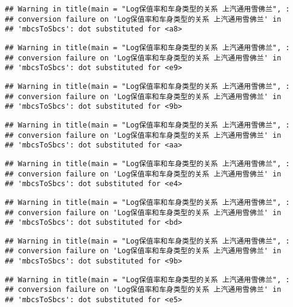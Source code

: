 \documentclass[]{article}
\begin{document}
\begin{verbatim}
## Warning in title(main = "Log保值率和车身类型的关系 上汽通用雪佛兰", :
## conversion failure on 'Log保值率和车身类型的关系 上汽通用雪佛兰' in
## 'mbcsToSbcs': dot substituted for <a8>
\end{verbatim}

\begin{verbatim}
## Warning in title(main = "Log保值率和车身类型的关系 上汽通用雪佛兰", :
## conversion failure on 'Log保值率和车身类型的关系 上汽通用雪佛兰' in
## 'mbcsToSbcs': dot substituted for <e9>
\end{verbatim}

\begin{verbatim}
## Warning in title(main = "Log保值率和车身类型的关系 上汽通用雪佛兰", :
## conversion failure on 'Log保值率和车身类型的关系 上汽通用雪佛兰' in
## 'mbcsToSbcs': dot substituted for <9b>
\end{verbatim}

\begin{verbatim}
## Warning in title(main = "Log保值率和车身类型的关系 上汽通用雪佛兰", :
## conversion failure on 'Log保值率和车身类型的关系 上汽通用雪佛兰' in
## 'mbcsToSbcs': dot substituted for <aa>
\end{verbatim}

\begin{verbatim}
## Warning in title(main = "Log保值率和车身类型的关系 上汽通用雪佛兰", :
## conversion failure on 'Log保值率和车身类型的关系 上汽通用雪佛兰' in
## 'mbcsToSbcs': dot substituted for <e4>
\end{verbatim}

\begin{verbatim}
## Warning in title(main = "Log保值率和车身类型的关系 上汽通用雪佛兰", :
## conversion failure on 'Log保值率和车身类型的关系 上汽通用雪佛兰' in
## 'mbcsToSbcs': dot substituted for <bd>
\end{verbatim}

\begin{verbatim}
## Warning in title(main = "Log保值率和车身类型的关系 上汽通用雪佛兰", :
## conversion failure on 'Log保值率和车身类型的关系 上汽通用雪佛兰' in
## 'mbcsToSbcs': dot substituted for <9b>
\end{verbatim}

\begin{verbatim}
## Warning in title(main = "Log保值率和车身类型的关系 上汽通用雪佛兰", :
## conversion failure on 'Log保值率和车身类型的关系 上汽通用雪佛兰' in
## 'mbcsToSbcs': dot substituted for <e5>
\end{verbatim}
\end{document}
